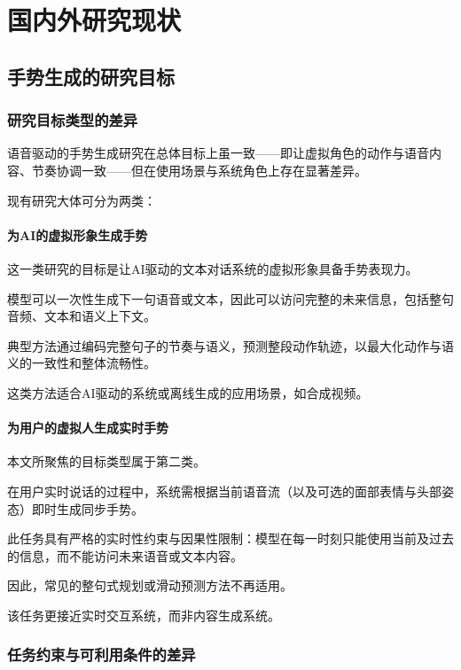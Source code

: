 \section{国内外研究现状}

\subsection{手势生成的研究目标}

\subsubsection{研究目标类型的差异}

语音驱动的手势生成研究在总体目标上虽一致——即让虚拟角色的动作与语音内容、节奏协调一致——但在使用场景与系统角色上存在显著差异。

现有研究大体可分为两类：

\paragraph{为AI的虚拟形象生成手势}

这一类研究的目标是让AI驱动的文本对话系统的虚拟形象具备手势表现力。

模型可以一次性生成下一句语音或文本，因此可以访问完整的未来信息，包括整句音频、文本和语义上下文。

典型方法通过编码完整句子的节奏与语义，预测整段动作轨迹，以最大化动作与语义的一致性和整体流畅性。

这类方法适合AI驱动的系统或离线生成的应用场景，如合成视频。

\paragraph{为用户的虚拟人生成实时手势}
本文所聚焦的目标类型属于第二类。

在用户实时说话的过程中，系统需根据当前语音流（以及可选的面部表情与头部姿态）即时生成同步手势。

此任务具有严格的实时性约束与因果性限制：模型在每一时刻只能使用当前及过去的信息，而不能访问未来语音或文本内容。

因此，常见的整句式规划或滑动预测方法不再适用。

该任务更接近实时交互系统，而非内容生成系统。

\subsubsection{任务约束与可利用条件的差异}

